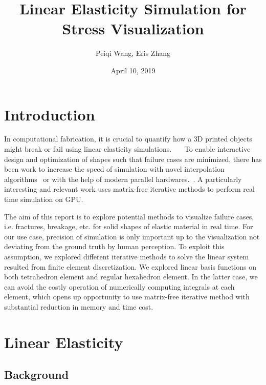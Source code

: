 \documentclass[11pt,titlepage]{article}
\title{Linear Elasticity Simulation for Stress Visualization}
\author{Peiqi Wang, Eris Zhang}
\date{April 10, 2019}
\begin{document}
\maketitle
\tableofcontents

\newpage
\section{Introduction}

In computational fabrication, it is crucial to quantify how a 3D printed objects might break or fail using linear elasticity simulations.~\cite{zhou_panetta_zorin_2013}~\cite{langlois_shamir_dror_matusik_levin_2016}~\cite{langlois_shamir_dror_matusik_levin_2016} To enable interactive design and optimization of shapes such that failure cases are minimized, there has been work to increase the speed of simulation with novel interpolation algorithms~\cite{schulz_xu_zhu_zheng_grinspun_matusik_2017} or with the help of modern parallel hardwares.~\cite{dick_georgii_westermann_2011}. A particularly interesting and relevant work uses matrix-free iterative methods to perform real time simulation on GPU.~\cite{yadav_suresh_2014}~\cite{marix_free_voxel_fem_thesis_2018}


 
The aim of this report is to explore potential methods to visualize failure cases, i.e. fractures, breakage, etc. for solid shapes of elastic material in real time. For our use case, precision of simulation is only important up to the visualization not deviating from the ground truth by human perception. To exploit this assumption, we explored different iterative methods to solve the linear system resulted from finite element discretization. We explored linear basis functions on both tetrahedron element and regular hexahedron element. In the latter case, we can avoid the costly operation of numerically computing integrals at each element, which opens up opportunity to use matrix-free iterative method with substantial reduction in memory and time cost.


\section{Linear Elasticity}

\subsection{Background}
\end{document}
